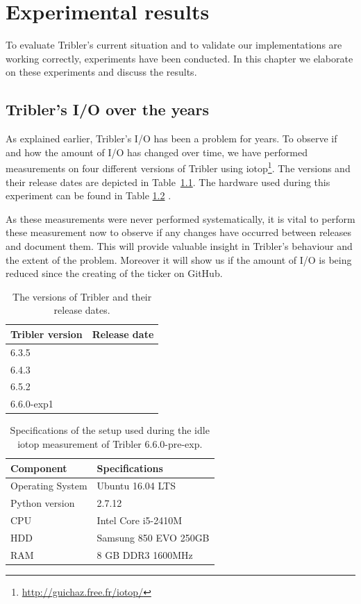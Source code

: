 \chapter{Experimental results}
\label{cpt:experiments}

To evaluate Tribler's current situation and to validate our implementations are working correctly, experiments have been conducted.
In this chapter we elaborate on these experiments and discuss the results. 

\section{Tribler's I/O over the years}
As explained earlier, Tribler's I/O has been a problem for years.
To observe if and how the amount of I/O has changed over time, we have performed measurements on four  different versions of Tribler using iotop\footnote{\url{http://guichaz.free.fr/iotop/}}.
The versions and their release dates are depicted in Table~\ref{table:tribler_version_dates}.
The hardware used during this experiment can be found in Table \ref{table:tribler_idle} .

As these measurements were never performed systematically, it is vital to perform these measurement now to observe if any changes have occurred between releases and document them.
This will provide valuable insight in Tribler's behaviour and the extent of the problem.
Moreover it will show us if the amount of I/O is being reduced since the creating of the ticker on GitHub.

\begin{table}[h]
	\centering
	\caption{The versions of Tribler and their release dates.}
	\label{table:tribler_version_dates}
	\begin{tabular}{|l|l|}
		\hline
		Tribler version & Release date \\ \hline
		6.3.5           &              \\ \hline
		6.4.3           &              \\ \hline
		6.5.2           &              \\ \hline
		6.6.0-exp1      &              \\ \hline
	\end{tabular}
\end{table}

\begin{table}[h]
	\centering
	\begin{tabular}{l|l}
		\textbf{Component} 	& \textbf{Specifications} \\ \hline
		Operating System   	& Ubuntu 16.04 LTS \\
		Python version		& 2.7.12 \\
		CPU					& Intel Core i5-2410M \\ 
		HDD					& Samsung 850 EVO 250GB  \\ 
		RAM					& 8 GB DDR3 1600MHz \\
	\end{tabular}
	\caption{Specifications of the setup used during the idle iotop measurement of Tribler 6.6.0-pre-exp.}
	\label{table:tribler_idle}
\end{table}

